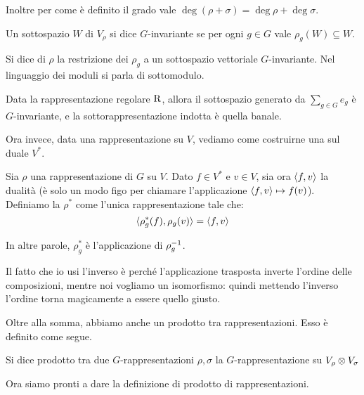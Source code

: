     Inoltre per come è definito il grado vale $\deg(\rho+\sigma)=\deg\rho+\deg\sigma$.
    
    \begin{mydef}
     Un sottospazio $W$ di $V_\rho$ si dice $G$-invariante se per ogni $g\in G$ vale $\rho_g(W)\subseteq W$.
    \end{mydef}

    \begin{mydef}
     Si dice  di $\rho$ la restrizione dei $\rho_g$ a un sottospazio vettoriale $G$-invariante. Nel linguaggio dei moduli si parla di sottomodulo.
    \end{mydef}
    
    \begin{myexample}
      Data la rappresentazione regolare $\operatorname{R}$, allora il sottospazio generato da $\sum_{g\in G} e_g$ è $G$-invariante, e la sottorappresentazione indotta è quella banale.
    \end{myexample}
       
    Ora invece, data una rappresentazione su $V$, vediamo come costruirne una sul duale $V^*$.
    \begin{mydef}
     Sia $\rho$ una rappresentazione di $G$ su $V$. Dato $f\in V^*$ e $v\in V$, sia ora $\langle f , v\rangle$ la dualità (è solo un modo figo per chiamare l'applicazione $\langle f , v\rangle \mapsto f(v)$). Definiamo la  $\rho^*$ come l'unica rappresentazione tale che:
     \[
      \langle\rho^*_g(f) , \rho_g (v)\rangle=\langle f , v\rangle
     \]
    \end{mydef}
    
    In altre parole, $\rho^*_g$ è l'applicazione  di $\rho_g^{-1}$.

    Il fatto che io usi l'inverso è perché l'applicazione trasposta inverte l'ordine delle composizioni, mentre noi vogliamo un isomorfismo: quindi mettendo l'inverso l'ordine torna magicamente a essere quello giusto.
    
    Oltre alla somma, abbiamo anche un prodotto tra rappresentazioni. Esso è definito come segue. 
    
    \begin{mydef}
     Si dice prodotto tra due $G$-rappresentazioni $\rho, \sigma$ la $G$-rappresentazione su $V_\rho \otimes V_\sigma$  
    \end{mydef}


    Ora siamo pronti a dare la definizione di prodotto di rappresentazioni.


